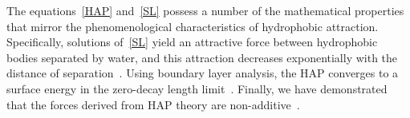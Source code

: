 The equations~\eqref{HAP} and~\eqref{SL} possess a number of the
mathematical properties that mirror the phenomenological characteristics
of hydrophobic attraction. Specifically, solutions of~\eqref{SL} yield
an attractive force between hydrophobic bodies separated by water, and
this attraction decreases exponentially with the distance of
separation~\cite{Eriksson1989}. Using boundary layer analysis, the HAP
converges to a surface energy in the zero-decay length
limit~\cite{Lee2018, Lin2015, Shibata2004}. Finally, we have
demonstrated that the forces derived from HAP theory are
non-additive~\cite{Meyer2006, Fu2018_SIAM}. 

